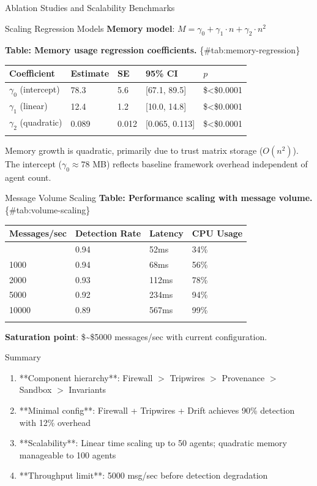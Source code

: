 \documentclass[
  ignorenonframetext,
]{beamer}
\newcounter{none} %
\begin{document}
\begin{frame}[fragile]{Ablation Studies and Scalability Benchmarks}
\begin{block}{Scaling Regression Models}
\textbf{Memory model}:
\(M = \gamma_0 + \gamma_1 \cdot n + \gamma_2 \cdot n^2\)

\textbf{Table: Memory usage regression coefficients.}
\{\#tab:memory-regression\}

{\def\LTcaptype{none} %
\begin{longtable}[]{@{}lllll@{}}
\toprule\noalign{}
Coefficient & Estimate & SE & 95\% CI & \(p\) \\
\midrule\noalign{}
\endhead
\(\gamma_0\) (intercept) & 78.3 & 5.6 & {[}67.1, 89.5{]} &
\$\textless\$0.0001 \\
\(\gamma_1\) (linear) & 12.4 & 1.2 & {[}10.0, 14.8{]} &
\$\textless\$0.0001 \\
\(\gamma_2\) (quadratic) & 0.089 & 0.012 & {[}0.065, 0.113{]} &
\$\textless\$0.0001 \\
\bottomrule\noalign{}
\end{longtable}
}

Memory growth is quadratic, primarily due to trust matrix storage
(\(O(n^2)\)). The intercept (\(\gamma_0 \approx 78\) MB) reflects
baseline framework overhead independent of agent count.
\end{block}

\begin{block}{Message Volume Scaling}
\protect{}\label{sec:volume-scaling}
\textbf{Table: Performance scaling with message volume.}
\{\#tab:volume-scaling\}

{\def\LTcaptype{none} %
\begin{longtable}[]{@{}llll@{}}
\toprule\noalign{}
Messages/sec & Detection Rate & Latency & CPU Usage \\
\midrule\noalign{}
\endhead
500 & 0.94 & 52ms & 34\% \\
1000 & 0.94 & 68ms & 56\% \\
2000 & 0.93 & 112ms & 78\% \\
5000 & 0.92 & 234ms & 94\% \\
10000 & 0.89 & 567ms & 99\% \\
\bottomrule\noalign{}
\end{longtable}
}

\textbf{Saturation point}: \$\sim\$5000 messages/sec with current
configuration.
\end{block}

\begin{block}{Summary}
\protect{}\label{sec:ablation-summary}
\begin{enumerate}
\item **Component hierarchy**: Firewall $>$ Tripwires $>$ Provenance $>$ Sandbox $>$ Invariants
\item **Minimal config**: Firewall + Tripwires + Drift achieves 90\% detection with 12\% overhead
\item **Scalability**: Linear time scaling up to 50 agents; quadratic memory manageable to 100 agents
\item **Throughput limit**: 5000 msg/sec before detection degradation
\end{enumerate}
\end{block}
\end{frame}
\end{document}
